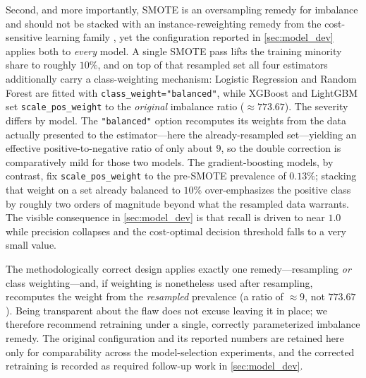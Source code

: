 Second, and more importantly, SMOTE is an oversampling remedy for imbalance and should not be stacked with an instance-reweighting remedy from the cost-sensitive learning family \citep{elkan2001foundations}, yet the configuration reported in \cref{sec:model_dev} applies both to \emph{every} model. A single SMOTE pass lifts the training minority share to roughly $10\%$, and on top of that resampled set all four estimators additionally carry a class-weighting mechanism: Logistic Regression and Random Forest are fitted with \texttt{class\_weight="balanced"}, while XGBoost and LightGBM set \texttt{scale\_pos\_weight} to the \emph{original} imbalance ratio ($\approx 773.67$). The severity differs by model. The \texttt{"balanced"} option recomputes its weights from the data actually presented to the estimator---here the already-resampled set---yielding an effective positive-to-negative ratio of only about $9$, so the double correction is comparatively mild for those two models. The gradient-boosting models, by contrast, fix \texttt{scale\_pos\_weight} to the pre-SMOTE prevalence of $0.13\%$; stacking that weight on a set already balanced to $10\%$ over-emphasizes the positive class by roughly two orders of magnitude beyond what the resampled data warrants. The visible consequence in \cref{sec:model_dev} is that recall is driven to near $1.0$ while precision collapses and the cost-optimal decision threshold falls to a very small value.

The methodologically correct design applies exactly one remedy---resampling \emph{or} class weighting---and, if weighting is nonetheless used after resampling, recomputes the weight from the \emph{resampled} prevalence (a ratio of $\approx 9$, not $773.67$). Being transparent about the flaw does not excuse leaving it in place; we therefore recommend retraining under a single, correctly parameterized imbalance remedy. The original configuration and its reported numbers are retained here only for comparability across the model-selection experiments, and the corrected retraining is recorded as required follow-up work in \cref{sec:model_dev}.

